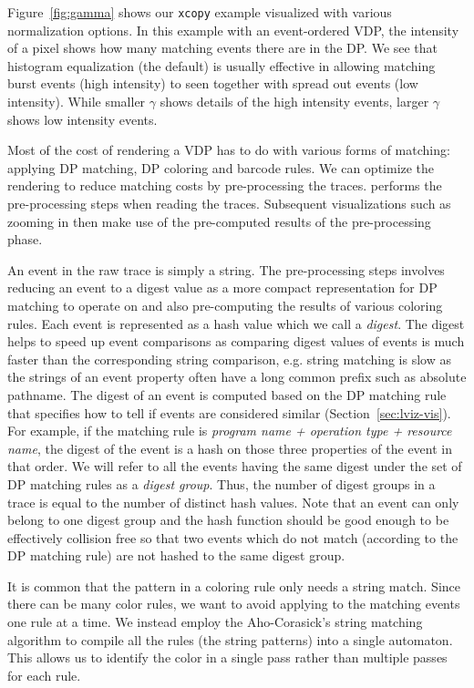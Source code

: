 Figure~\ref{fig:gamma} shows our {\tt xcopy} example visualized
with various normalization options.
In this example with an event-ordered VDP,
the intensity of a pixel shows how many matching events there are in the DP.
We see that histogram equalization (the default) is usually effective
in allowing matching burst events (high intensity) to seen together
with spread out events (low intensity).
While smaller $\gamma$ shows details of the high intensity events,
larger $\gamma$ shows low intensity events.

Most of the cost of rendering a VDP has to do with various forms of
matching: applying DP matching, DP coloring and barcode rules.
We can optimize the rendering to reduce matching costs by pre-processing
the traces.  performs the pre-processing steps when reading the
traces. Subsequent visualizations such as zooming in then make use of
the pre-computed results of the pre-processing phase.

An event in the raw trace is simply a string.
The pre-processing steps involves reducing an event to
a digest value as a more compact representation for DP matching
to operate on and also pre-computing the
results of various coloring rules.
Each event is represented as a hash value which we call a {\em digest}.
The digest helps to speed up event comparisons
as comparing digest values of events is much faster than
the corresponding string comparison, e.g. string matching is slow
as the strings of an event property often have a long common prefix such
as absolute pathname.
The digest of an event is computed based on the DP matching rule that specifies
how to tell if events are considered similar (Section~\ref{sec:lviz-vis}).
For example, if the matching rule is 
{\em program name + operation type + resource name}, the digest
of the event is a hash on those three properties of the event in that order.
We will refer to all the events having the same digest under
the set of DP matching rules as a {\em digest group}.
Thus, the number of digest groups in a trace is equal to the number of distinct hash values.
Note that an event can only belong to one digest group and the hash function
should be good enough to be effectively collision free so that 
two events which do not match (according to the DP matching rule) are
not hashed to the same digest group.

It is common that the pattern in a coloring rule only needs a string
match.
Since there can be many color rules, we want to avoid applying
to the matching events one rule at a time.
We instead employ the Aho-Corasick's string matching
algorithm \cite{aho1975efficient}
to compile all the rules (the string patterns) into a single automaton.
This allows us to identify the color in a single pass
rather than multiple passes for each rule.

